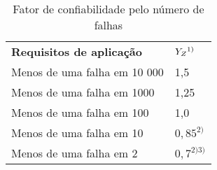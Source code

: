 \begin{table}
\centering
\caption{\label{tab:2} Fator de confiabilidade pelo número de falhas}
\begin{tabular}{ll}
\textbf{Requisitos de aplicação}      & \textbf{$Y_Z \\ ^{1)}$ }   \\
Menos de uma falha em 10 000 & 1,5       \\
Menos de uma falha em 1000   & 1,25      \\
Menos de uma falha em 100    & 1,0       \\
Menos de uma falha em 10     & $0,85 ^{2)}$   \\
Menos de uma falha em 2      & $0,7^{2) 3)}$
\end{tabular}
\end{table}
